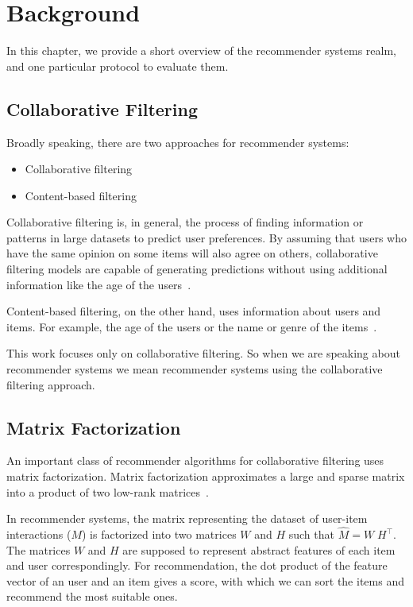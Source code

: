 
\chapter{Background}
\label{background}
In this chapter, we provide a short overview of the recommender systems realm, and one particular protocol to evaluate them.


\section{Collaborative Filtering}
Broadly speaking, there are two approaches for recommender systems:
\begin{itemize}
\item Collaborative filtering
\item Content-based filtering
\end{itemize}

Collaborative filtering is, in general, the process of finding 
information or patterns in large datasets to predict user preferences. By assuming that users who 
have the same opinion on some items will also agree on others, collaborative filtering models are capable of generating predictions without using additional information like the age of 
the users~\cite{collaborativefiltering}.

Content-based filtering, on the other hand, uses information about users and items.
For example, the age of the users or the name or genre of the items~\cite{contentbasedfiltering}.

This work focuses only on collaborative filtering. So when we are 
speaking about recommender systems we mean recommender systems
using the collaborative filtering approach.


\section{Matrix Factorization}
\label{matrixfactorization}
An important class of recommender algorithms for collaborative filtering uses matrix factorization. 
Matrix factorization approximates a large and sparse matrix into a product of two low-rank matrices~\cite{matrixfactorization}.

In recommender systems, the matrix representing the dataset of user-item interactions ($M$) is factorized into
two matrices \(W\) and \(H\) such that \(\hat{M} = W\;H^\top\).
The matrices \(W\) and \(H\) are supposed to represent abstract
features of each item and user correspondingly. For recommendation, the dot product
of the feature vector of an user and an item gives a score, with which
we can sort the items and recommend the most suitable ones. 



